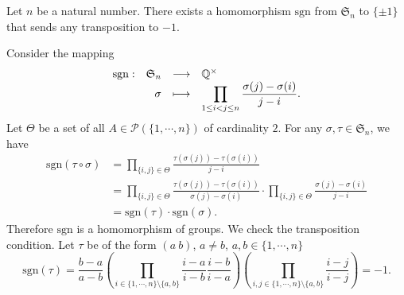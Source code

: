 \begin{propositionenv}
    Let $n$ be a natural number.
    There exists a homomorphism $\mathrm{sgn}$ from $\mathfrak{S}_n$ to $\{\pm 1\}$ that sends any transposition to $-1$.
\end{propositionenv}
\begin{proofenv}
    Consider the mapping
    $$\begin{array}{rrcl}
        \mathrm{sgn} : & \mathfrak{S}_n & \longrightarrow & \mathbb{Q}^{\times}\\
        & \sigma & \longmapsto & \displaystyle\prod_{1\le i < j \le n} \frac{\sigma(j) - \sigma(i)}{j - i}.
    \end{array}$$
    Let $\Theta$ be a set of all $A \in \mathscr{P}(\{1,\cdots,n\})$ of cardinality $2$.
    For any $\sigma, \tau \in \mathfrak{S}_n$, we have
    $$\begin{aligned}
        \mathrm{sgn}(\tau \circ \sigma) & = \prod_{\{i,j\} \in \Theta} \frac{\tau(\sigma(j)) - \tau(\sigma(i))}{j - i}\\
        & = \prod_{\{i,j\} \in \Theta} \frac{\tau(\sigma(j)) - \tau(\sigma(i))}{\sigma(j) - \sigma(i)} \cdot \prod_{\{i,j\} \in \Theta} \frac{\sigma(j) - \sigma(i)}{j - i}\\
        & = \mathrm{sgn}(\tau) \cdot \mathrm{sgn}(\sigma).
    \end{aligned}$$
    Therefore $\mathrm{sgn}$ is a homomorphism of groups.
    We check the transposition condition.
    Let $\tau$ be of the form $(a\ b)$, $a\neq b$, $a,b \in \{1,\cdots,n\}$
    $$ \mathrm{sgn} (\tau) = \frac{b - a}{a - b} \left(\prod_{i \in \{1, \cdots, n\} \setminus \{a,b\}} \frac{i - a}{i - b}\frac{i - b}{i - a}\right) \left(\prod_{i,j \in \{1,\cdots,n\}\setminus\{a,b\}}\frac{i - j}{i - j}\right) = -1.$$
\end{proofenv}

